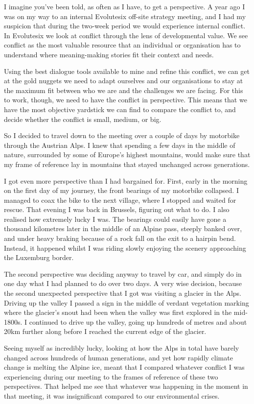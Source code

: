 \begin{longstoryblock}
I imagine you've been told, as often as I have, to get a perspective. A year ago I was on my way to an internal Evolutesix off-site strategy meeting, and I had my suspicion that during the two-week period we would experience internal conflict. In Evolutesix we look at conflict through the lens of developmental value. We see conflict as the most valuable resource that an individual or organisation has to understand where meaning-making stories fit their context and needs.


Using the best dialogue tools available to mine and refine this conflict, we can get at the gold nuggets we need to adapt ourselves and our organisations to stay at the maximum fit between who we are and the challenges we are facing. For this to work, though, we need to have the conflict in perspective. This means that we have the most objective yardstick we can find to compare the conflict to, and decide whether the conflict is small, medium, or big.


So I decided to travel down to the meeting over a couple of days by motorbike through the Austrian Alps. I knew that spending a few days in the middle of nature, surrounded by some of Europe’s highest mountains, would make sure that my frame of reference lay in mountains that stayed unchanged across generations.


I got even more perspective than I had bargained for. First, early in the morning on the first day of my journey, the front bearings of my motorbike collapsed. I managed to coax the bike to the next village, where I stopped and waited for rescue. That evening I was back in Brussels, figuring out what to do. I also realised how extremely lucky I was. The bearings could easily have gone a thousand kilometres later in the middle of an Alpine pass, steeply banked over, and under heavy braking because of a rock fall on the exit to a hairpin bend. Instead, it happened whilst I was riding slowly enjoying the scenery approaching the Luxemburg border.


The second perspective was deciding anyway to travel by car, and simply do  in one day what I had planned to do over two days. A very wise decision, because the second unexpected perspective that I got was visiting a glacier in the Alps. Driving up the valley I passed a sign in the middle of verdant vegetation marking where the glacier's snout had been when the valley was first explored in the mid-1800s. I continued to drive up the valley, going up hundreds of metres and about 20km further along before I reached the current edge of the glacier. 


Seeing myself as incredibly lucky, looking at how the Alps in total have barely changed across hundreds of human generations, and yet how rapidly climate change is melting the Alpine ice, meant that I compared whatever conflict I was experiencing during our meeting to the frames of reference of these two perspectives. That helped me see that whatever was happening in the moment in that meeting, it was insignificant compared to our environmental crises. 
\end{longstoryblock}


